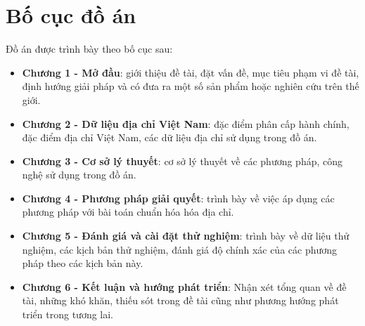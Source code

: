 \section{Bố cục đồ án}
Đồ án được trình bày theo bố cục sau:
\begin{itemize}
\item \textbf{Chương 1 - Mở đầu}: giới thiệu đề tài, đặt vấn đề, mục tiêu phạm vi đề tài, định hướng giải pháp và có đưa ra một số sản phẩm hoặc nghiên cứu trên thế giới.
\item \textbf{Chương 2 - Dữ liệu địa chỉ Việt Nam}: đặc điểm phân cấp hành chính, đặc điểm địa chỉ Việt Nam, các dữ liệu địa chỉ sử dụng trong đồ án.
\item \textbf{Chương 3 - Cơ sở lý thuyết}: cơ sở lý thuyết về các phương pháp, công nghệ sử dụng trong đồ án.
\item \textbf{Chương 4 - Phương pháp giải quyết}: trình bày về việc áp dụng các phương pháp với bài toán chuẩn hóa hóa địa chỉ.
\item \textbf{Chương 5 - Đánh giá và cài đặt thử nghiệm}: trình bày về dữ liệu thử nghiệm, các kịch bản thử nghiệm, đánh giá độ chính xác của các phương pháp theo các kịch bản này.
\item \textbf{Chương 6 - Kết luận và hướng phát triển}: Nhận xét tổng quan về đề tài, những khó khăn, thiếu sót trong đề tài cũng như phương hướng phát triển trong tương lai. 
\end{itemize}
\newpage 
